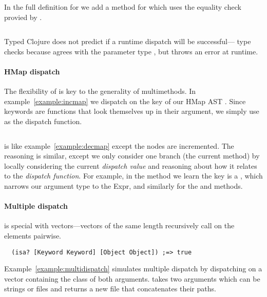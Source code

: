 In the full definition for  we add a method for 
which uses the equality check provied by .

\begin{Code}
\begin{exmp}
\inputminted[firstline=5,lastline=11]{clojure}{code/demo/src/demo/rep.clj}
\label{example:rep}
\end{exmp}
\end{Code}

Typed Clojure does not predict if a runtime dispatch will be successful--- 
type checks because  agrees with the parameter type ,
but throws an error at runtime.

\paragraph{HMap dispatch} The flexibility of  is key to the generality of multimethods. 
In example~\ref{example:incmap} we
dispatch on the  key 
of our HMap AST .
Since keywords are functions that look themselves up in their argument, we simply
use  as the dispatch function.

\begin{exmp}
\inputminted[firstline=5,lastline=18]{clojure}{code/demo/src/demo/eg5.clj}
\label{example:incmap}
\end{exmp}

 is like example~\ref{example:decmap} except the nodes are incremented.
The reasoning is similar, except we only consider one branch (the current method) by
locally considering the current \emph{dispatch value} and reasoning about how it relates
to the \emph{dispatch function}.
For example, 
in the  method we learn the  key is a , which
narrows our argument type to the  Expr, and similarly for the 
and  methods.

\paragraph{Multiple dispatch}  is special with vectors---vectors of the
same length recursively call  on the elements pairwise.
\begin{verbatim}
  (isa? [Keyword Keyword] [Object Object]) ;=> true
\end{verbatim}

Example~\ref{example:multidispatch}
simulates multiple dispatch by dispatching on
a vector containing the class of both arguments. 
takes two arguments which can be strings or files and returns
a new file that concatenates their paths.


